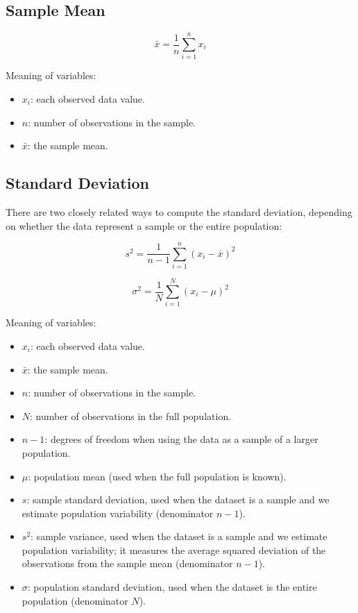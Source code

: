 \subsection{Sample Mean}\label{sec:interval-sample-mean}

\[
\bar{x} = \frac{1}{n} \sum_{i=1}^{n} x_i
\]

Meaning of variables:

\begin{itemize}
	\item \(x_i\): each observed data value.
	\item \(n\): number of observations in the sample.
	\item \(\bar{x}\): the sample mean.
\end{itemize}

\subsection{Standard Deviation}\label{sec:interval-standard-deviation}

There are two closely related ways to compute the standard deviation, depending on whether the data represent a sample or the entire population:

\[
 s^2 = \frac{1}{n - 1} \sum_{i=1}^{n}(x_i - \bar{x})^2
\]

\[
\sigma^2 = \frac{1}{N} \sum_{i=1}^{N}(x_i - \mu)^2
\]

Meaning of variables:

\begin{itemize}
	\item \(x_i\): each observed data value.
	\item \(\bar{x}\): the sample mean.
	\item \(n\): number of observations in the sample.
	\item \(N\): number of observations in the full population.
	\item \(n - 1\): degrees of freedom when using the data as a sample of a larger population.
	\item \(\mu\): population mean (used when the full population is known).
	\item \(s\): sample standard deviation, used when the dataset is a sample and we estimate population variability (denominator \(n - 1\)).
	\item \(s^2\): sample variance, used when the dataset is a sample and we estimate population variability; it measures the average squared deviation of the observations from the sample mean (denominator \(n - 1\)).
	\item \(\sigma\): population standard deviation, used when the dataset is the entire population (denominator \(N\)).
\end{itemize}

